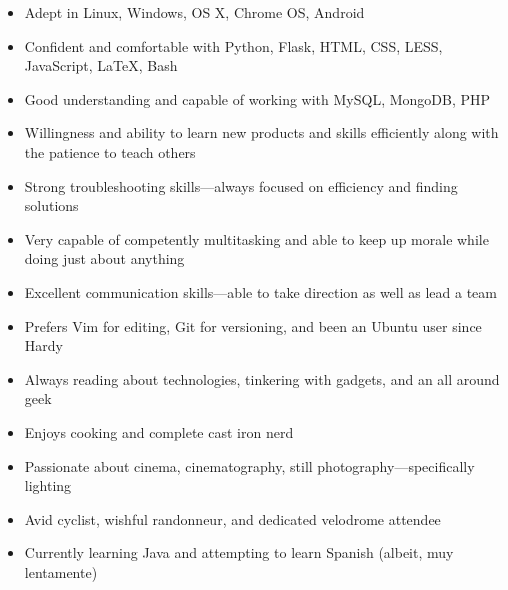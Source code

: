 \documentclass[letterpaper]{article}        %
\begin{document}



  \begin{multicols}{2}
    \begin{itemize}
      \item Adept in Linux, Windows, OS X, Chrome OS, Android
      \item Confident and comfortable with Python, Flask, HTML, CSS, LESS, JavaScript, \LaTeX{}, Bash
      \item Good understanding and capable of working with MySQL, MongoDB, PHP
      \item Willingness and ability to learn new products and skills efficiently along with the patience to teach others
      \item Strong troubleshooting skills---always focused on efficiency and finding solutions
      \item Very capable of competently multitasking and able to keep up morale while doing just about anything
      \item Excellent communication skills---able to take direction as well as lead a team
      \item Prefers Vim for editing, Git for versioning, and been an Ubuntu user since Hardy
      \item Always reading about technologies, tinkering with gadgets, and an all around geek
      \item Enjoys cooking and complete cast iron nerd
      \item Passionate about cinema, cinematography, still photography---specifically lighting
      \item Avid cyclist, wishful randonneur, and dedicated velodrome attendee
      \item Currently learning Java and attempting to learn Spanish (albeit, muy lentamente)
    \end{itemize}
  \end{multicols}
\end{document}
